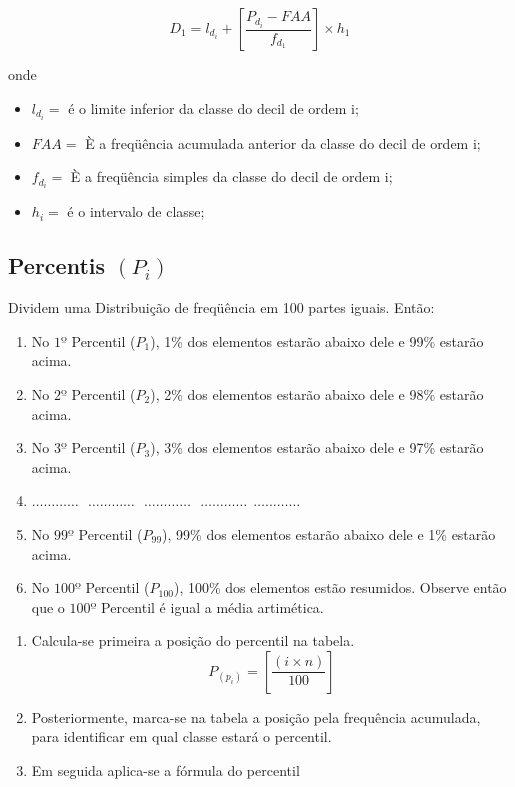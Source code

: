\begin{equation}\label{}
    D_{1}= l_{d_{i}}+\left[\frac{P_{d_{i}}-FAA}{f_{d_{1}}}\right]\times h_{1}
\end{equation}

 onde

 \begin{itemize}
   \item $l_{d_{i}}=$ é o limite inferior da classe do decil de ordem i;
   \item $FAA=$ È a freqüência acumulada anterior da classe do decil de ordem i;
   \item $f_{d_{i}}=$ È a freqüência simples da classe do decil de ordem i;
   \item $h_{i}=$ é o intervalo de classe;
 \end{itemize}



\subsection{Percentis $(P_{i})$}

Dividem uma Distribuição de freqüência em 100 partes iguais. Então:


\begin{enumerate}
  \item[{1)}] No $1º$ Percentil ($P_{1}$), 1\% dos elementos estarão abaixo dele e 99\% estarão acima.
  \item[{2)}] No $2º$ Percentil ($P_{2}$), 2\% dos elementos estarão abaixo dele e 98\% estarão acima.
  \item[{3)}] No $3º$ Percentil ($P_{3}$), 3\% dos elementos estarão abaixo dele e 97\% estarão acima.
   \item[{4)}] $\ldots \ldots \ldots \ldots \ \ \  \ldots \ldots \ldots \ldots \ \ \  \ldots \ldots \ldots \ldots \ \ \  \ldots \ldots \ldots \ldots \ \ \ldots \ldots \ldots \ldots$
  \item[{5)}] No $99º$ Percentil ($P_{99}$), 99\% dos elementos estarão abaixo dele e 1\% estarão acima.
   \item[{6)}] No $100º$ Percentil ($P_{100}$), 100\% dos elementos estão resumidos. Observe então que o $100º$ Percentil é igual a média artimética.
\end{enumerate}



\begin{enumerate}
\item [{1)}]Calcula-se primeira a posição do percentil na tabela.
$$ P_{(p_{i})} = \left[ \frac{(i \times n)}{100} \right] $$
\item [{2)}] Posteriormente, marca-se na tabela a posição pela frequência acumulada, para identificar em qual classe estará o percentil.
\item [{3)}] Em seguida aplica-se a fórmula do percentil
\end{enumerate}

